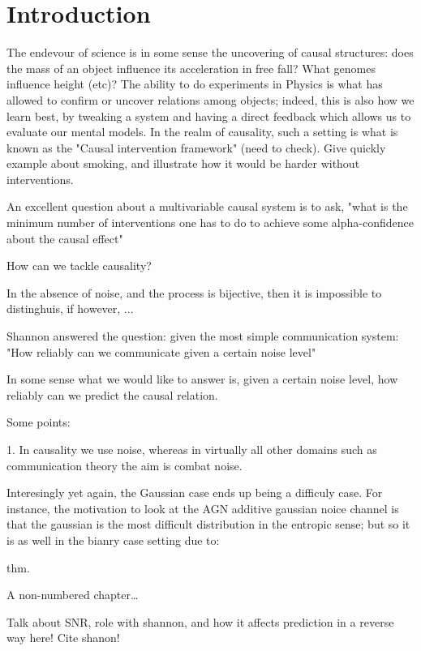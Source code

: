 \cleardoublepage
\chapter*{Introduction}

The endevour of science is in some sense the uncovering of causal structures: does the mass
of an object influence its acceleration in free fall? What genomes influence height (etc)? 
The ability to do experiments in Physics is what has allowed to confirm or uncover relations
among objects; indeed, this is also how we learn best, by tweaking a system and having a 
direct feedback which allows us to evaluate our mental models. In the realm of causality, 
such a setting is what is known as the "Causal intervention framework" (need to check). 
Give quickly example about smoking, and illustrate how it would be harder without interventions.



An excellent question about a multivariable causal system is to ask, "what is the minimum number
of interventions one has to do to achieve some alpha-confidence about the causal effect"


How can we tackle causality?

In the absence of noise, and the process is bijective, then it is impossible to distinghuis, 
if however, ...

Shannon answered the question: given the most simple communication system: "How reliably can 
we communicate given a certain noise level"

In some sense what we would like to answer is, given a certain noise level, how reliably can we 
predict the causal relation. 

Some points:

1. In causality we use noise, whereas in virtually all other domains
 such as communication theory the aim is combat noise.

 Interesingly yet again, the Gaussian case ends up being a difficuly case. For instance, 
 the motivation to look at the AGN additive gaussian noice channel is that the gaussian is 
 the most difficult distribution in the entropic sense; but so it is as well in the 
 bianry case setting due to:

 thm.


A non-numbered chapter\dots


Talk about SNR, role with shannon, and how it affects prediction in a reverse way here! Cite shanon!

